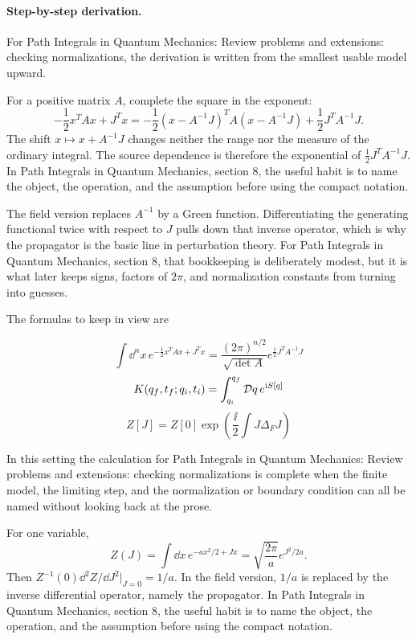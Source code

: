 \paragraph{Step-by-step derivation.}

For Path Integrals in Quantum Mechanics: Review problems and extensions: checking normalizations, the derivation is written from the smallest usable model upward.

For a positive matrix \(A\), complete the square in the exponent:
\[
  -\frac12x^TAx+J^Tx
  =
  -\frac12(x-A^{-1}J)^TA(x-A^{-1}J)
  +\frac12J^TA^{-1}J.
\]
The shift \(x\mapsto x+A^{-1}J\) changes neither the range nor the measure of the ordinary integral.  The source dependence is therefore the exponential of \(\frac12J^TA^{-1}J\).  In Path Integrals in Quantum Mechanics, section 8, the useful habit is to name the object, the operation, and the assumption before using the compact notation.

The field version replaces \(A^{-1}\) by a Green function.  Differentiating the generating functional twice with respect to \(J\) pulls down that inverse operator, which is why the propagator is the basic line in perturbation theory.  For Path Integrals in Quantum Mechanics, section 8, that bookkeeping is deliberately modest, but it is what later keeps signs, factors of \(2\pi\), and normalization constants from turning into guesses.

The formulas to keep in view are

\[
  \int\dd^n x\,e^{-\frac12x^TAx+J^Tx}=\frac{(2\pi)^{n/2}}{\sqrt{\det A}}e^{\frac12J^TA^{-1}J}
\]
\[
  K(q_f,t_f;q_i,t_i)=\int_{q_i}^{q_f}\mathcal D q\,e^{\mathrm i S[q]}
\]
\[
  Z[J]=Z[0]\exp\left(\frac{\ii}{2}\int J\Delta_FJ\right)
\]

In this setting the calculation for Path Integrals in Quantum Mechanics: Review problems and extensions: checking normalizations is complete when the finite model, the limiting step, and the normalization or boundary condition can all be named without looking back at the prose.




\begin{example}
For one variable,
\[
  Z(J)=\int\dd x\,e^{-ax^2/2+Jx}
  =\sqrt{\frac{2\pi}{a}}e^{J^2/2a}.
\]
Then \(Z^{-1}(0)\dd^2Z/\dd J^2|_{J=0}=1/a\).  In the field version, \(1/a\) is replaced by the inverse differential operator, namely the propagator.  In Path Integrals in Quantum Mechanics, section 8, the useful habit is to name the object, the operation, and the assumption before using the compact notation.
\end{example}



